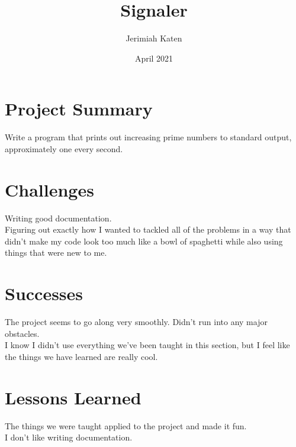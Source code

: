 \documentclass{article}
\title{Signaler}
\author{Jerimiah Katen}
\date{April 2021}
\begin{document}
\maketitle

\section{Project Summary}

Write a program that prints out increasing prime numbers to standard output, approximately one every second.


\section{Challenges}

Writing good documentation.
\\[.5cm]
Figuring out exactly how I wanted to tackled all of the problems in a way that didn't make my code look too much like a bowl of spaghetti while also using things that were new to me.


\section{Successes}
The project seems to go along very smoothly. Didn't run into any major obstacles.
\\[.5cm]
I know I didn't use everything we've been taught in this section, but I feel like the things we have learned are really cool.


\section{Lessons Learned}
The things we were taught applied to the project and made it fun.
\\[.5cm]
I don't like writing documentation.
\end{document}
